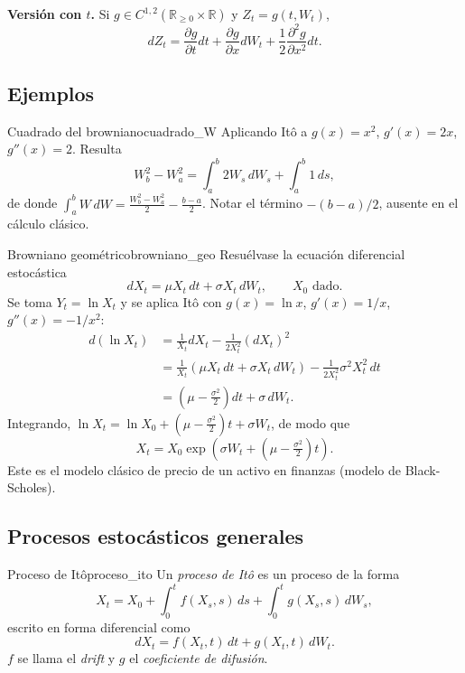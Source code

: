 \documentclass[11pt, a4paper]{article}
\begin{document}
\textbf{Versión con $t$.} Si $g \in C^{1, 2}(\mathbb{R}_{\ge 0} \times \mathbb{R})$ y
$Z_t = g(t, W_t)$,
$$ dZ_t = \frac{\partial g}{\partial t} dt + \frac{\partial g}{\partial x} dW_t + \frac{1}{2}
\frac{\partial^2 g}{\partial x^2} dt. $$

\subsection{Ejemplos}

\begin{ejemplo}{Cuadrado del browniano}{cuadrado_W}
Aplicando Itô a $g(x) = x^2$, $g'(x) = 2x$, $g''(x) = 2$. Resulta
$$ W_b^2 - W_a^2 = \int_a^b 2 W_s \, dW_s + \int_a^b 1 \, ds, $$
de donde $\int_a^b W \, dW = \tfrac{W_b^2 - W_a^2}{2} - \tfrac{b - a}{2}$. Notar el término
$-(b-a)/2$, ausente en el cálculo clásico.
\end{ejemplo}

\begin{ejemplo}{Browniano geométrico}{browniano_geo}
Resuélvase la ecuación diferencial estocástica
$$ dX_t = \mu X_t \, dt + \sigma X_t \, dW_t, \qquad X_0 \text{ dado}. $$
Se toma $Y_t = \ln X_t$ y se aplica Itô con $g(x) = \ln x$, $g'(x) = 1/x$, $g''(x) = -1/x^2$:
\begin{align*}
d(\ln X_t) &= \frac{1}{X_t} dX_t - \frac{1}{2 X_t^2} (dX_t)^2 \\
&= \frac{1}{X_t} (\mu X_t \, dt + \sigma X_t \, dW_t) - \frac{1}{2 X_t^2} \sigma^2 X_t^2 \, dt \\
&= \left(\mu - \tfrac{\sigma^2}{2}\right) dt + \sigma \, dW_t.
\end{align*}
Integrando, $\ln X_t = \ln X_0 + (\mu - \tfrac{\sigma^2}{2}) t + \sigma W_t$, de modo que
$$ X_t = X_0 \exp\!\left(\sigma W_t + \left(\mu - \tfrac{\sigma^2}{2}\right) t\right). $$
Este es el modelo clásico de precio de un activo en finanzas (modelo de Black-Scholes).
\end{ejemplo}

\newpage

\subsection{Procesos estocásticos generales}

\begin{definicion}{Proceso de Itô}{proceso_ito}
Un \emph{proceso de Itô} es un proceso de la forma
$$ X_t = X_0 + \int_0^t f(X_s, s) \, ds + \int_0^t g(X_s, s) \, dW_s, $$
escrito en forma diferencial como
$$ dX_t = f(X_t, t) \, dt + g(X_t, t) \, dW_t. $$
$f$ se llama el \emph{drift} y $g$ el \emph{coeficiente de difusión}.
\end{definicion}
\end{document}
